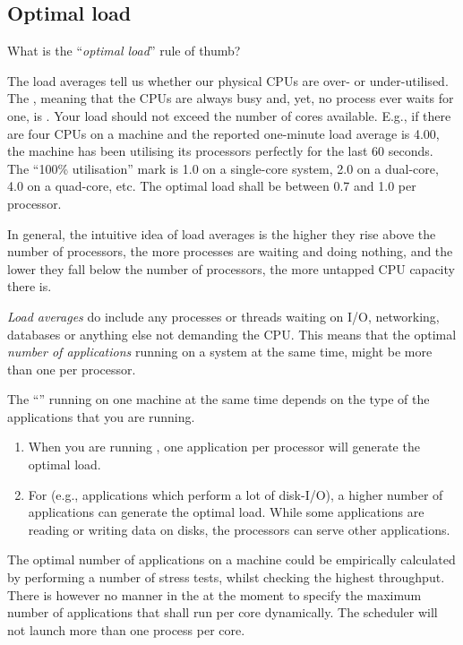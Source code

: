 \subsection{Optimal load}

What is the ``\emph{optimal load}'' rule of thumb?

The load averages tell us whether our physical CPUs are over- or
under-utilised. The , meaning that the
CPUs are always busy and, yet, no process ever waits for one, is .  Your load should not exceed the number
of cores available.  E.g., if there are four CPUs on a machine and the reported
one-minute load average is 4.00, the machine has been utilising its processors
perfectly for the last 60 seconds. The ``100\% utilisation'' mark is 1.0 on a
single-core system, 2.0 on a dual-core, 4.0 on a quad-core, etc. The optimal
load shall be between 0.7 and 1.0 per processor.

In general, the intuitive idea of load averages is the higher they rise above
the number of processors, the more processes are waiting and doing nothing, and the lower
they fall below the number of processors, the more untapped CPU capacity there
is.

\emph{Load averages} do include any processes or threads waiting on I/O,
networking, databases or anything else not demanding the CPU.
This means that the optimal
\emph{number of applications} running on a system at the same time, might be
more than one per processor.

The ``'' running on one machine at the
same time depends on the type of the applications that you are running.

\begin{enumerate}
\item  When you are running , one
  application per processor will generate the optimal load.
\item  For  (e.g., applications which perform
  a lot of disk-I/O), a higher number of applications can generate the optimal
  load. While some applications are reading or writing data on disks, the
  processors can serve other applications.
\end{enumerate}

The optimal number of applications on a machine could be empirically calculated
by performing a number of stress tests, whilst checking the highest throughput.
There is however no manner in the \hpc at the moment to specify the maximum
number of applications that shall run per core dynamically. The \hpc scheduler
will not launch more than one process per core.

